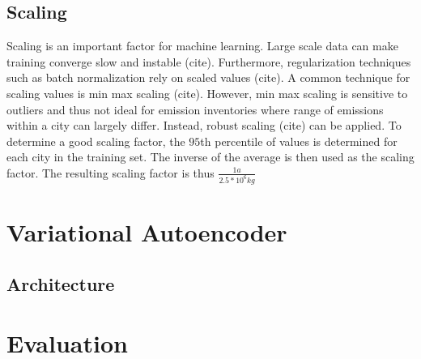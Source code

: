 \subsection{Scaling}
Scaling is an important factor for machine learning.
Large scale data can make training converge slow and instable (cite).
Furthermore, regularization techniques such as batch normalization rely on scaled values (cite).
A common technique for scaling values is min max scaling (cite).
However, min max scaling is sensitive to outliers and thus not ideal for emission inventories where range of emissions within a city can largely differ.
Instead, robust scaling (cite) can be applied.
To determine a good scaling factor, the $95$th percentile of values is determined for each city in the training set.
The inverse of the average is then used as the scaling factor.
The resulting scaling factor is thus $\frac{1 a}{2.5 * 10^6 kg}$

\section{Variational Autoencoder}

\subsection{Architecture}

\section{Evaluation}


